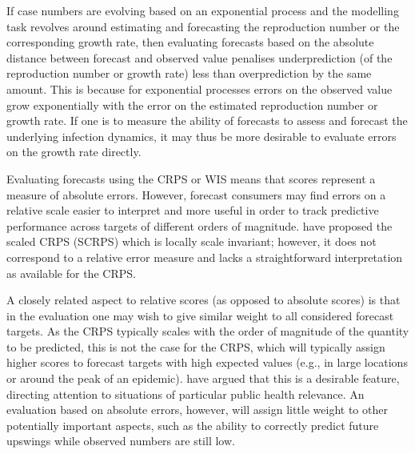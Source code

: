 \documentclass{article}
\begin{document}
If case numbers are evolving based on an exponential process and the  modelling task revolves around estimating and forecasting the reproduction number or the corresponding growth rate, then evaluating forecasts based on the absolute distance between forecast and observed value penalises underprediction (of the reproduction number or growth rate) less than overprediction by the same amount. This is because for exponential processes errors on the observed value grow exponentially with the error on the estimated reproduction number or growth rate. 
If one is to measure the ability of forecasts to assess and forecast the underlying infection dynamics, it may thus be more desirable to evaluate errors on the growth rate directly.

Evaluating forecasts using the CRPS or WIS means that scores represent a measure of absolute errors. However, forecast consumers may find errors on a relative scale easier to interpret and more useful in order to track predictive performance across targets of different orders of magnitude. 
\cite{bolinLocalScaleInvariance2021} have proposed the scaled CRPS (SCRPS) which is locally scale invariant; however, it does not correspond to a relative error measure and lacks a straightforward interpretation as available for the CRPS. 

A closely related aspect to relative scores (as opposed to absolute scores) is that in the evaluation one may wish to give similar weight to all considered forecast targets. As the CRPS typically scales with the order of magnitude of the quantity to be predicted, this is not the case for the CRPS, which will typically assign higher scores to forecast targets with high expected values (e.g., in large locations or around the peak of an epidemic). \cite{bracherEvaluatingEpidemicForecasts2021} have argued that this is a desirable feature, directing attention to situations of particular public health relevance. An evaluation based on absolute errors, however, will assign little weight to other potentially important aspects, such as the ability to correctly predict future upswings while observed numbers are still low. 
\end{document}

